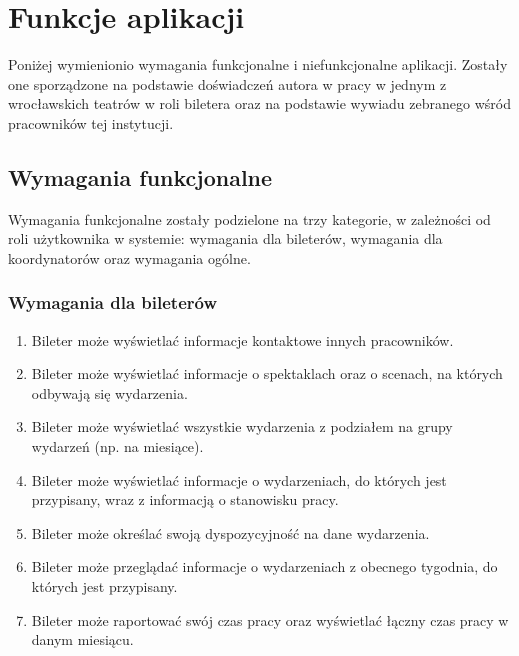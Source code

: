 \documentclass[shortabstract]{iithesis}
\begin{document}
\section{Funkcje aplikacji}

Poniżej wymienionio wymagania funkcjonalne i niefunkcjonalne aplikacji. Zostały one sporządzone na podstawie doświadczeń autora w pracy w jednym z wrocławskich teatrów w roli biletera oraz na podstawie wywiadu zebranego wśród pracowników tej instytucji.

\subsection{Wymagania funkcjonalne}

Wymagania funkcjonalne zostały podzielone na trzy kategorie, w zależności od roli użytkownika w systemie: wymagania dla bileterów, wymagania dla koordynatorów oraz wymagania ogólne.

\subsubsection*{Wymagania dla bileterów}
\begin{enumerate}
  \item Bileter może wyświetlać informacje kontaktowe innych pracowników.
  \item Bileter może wyświetlać informacje o spektaklach oraz o scenach, na których odbywają się wydarzenia.
  \item Bileter może wyświetlać wszystkie wydarzenia z podziałem na grupy wydarzeń (np. na miesiące).
  \item Bileter może wyświetlać informacje o wydarzeniach, do których jest przypisany, wraz z informacją o stanowisku pracy.
  \item Bileter może określać swoją dyspozycyjność na dane wydarzenia.
  \item Bileter może przeglądać informacje o wydarzeniach z obecnego tygodnia, do których jest przypisany.
  \item Bileter może raportować swój czas pracy oraz wyświetlać łączny czas pracy w danym miesiącu.
\end{enumerate}
\end{document}
